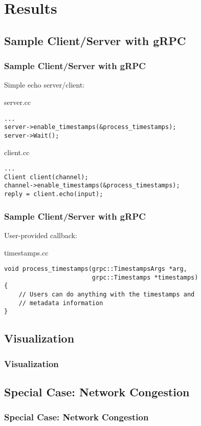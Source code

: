 \documentclass[10pt]{beamer}
\begin{document}

\section{Results}


\subsection{Sample Client/Server with gRPC}
\begin{frame}[fragile]
\frametitle{Sample Client/Server with gRPC}
Simple echo server/client:
\begin{block}{\normalsize server.cc}
      {\small
      \begin{verbatim}
...
server->enable_timestamps(&process_timestamps);
server->Wait();\end{verbatim}
      }
\end{block}
\begin{block}{\normalsize client.cc}
      {\small
      \begin{verbatim}
...
Client client(channel);
channel->enable_timestamps(&process_timestamps);
reply = client.echo(input);\end{verbatim}
      }
\end{block}
\end{frame}

\begin{frame}[fragile]
\frametitle{Sample Client/Server with gRPC}
User-provided callback:
\begin{block}{\normalsize timestamps.cc}
      {\small
      \begin{verbatim}
void process_timestamps(grpc::TimestampsArgs *arg,
                        grpc::Timestamps *timestamps)
{
    // Users can do anything with the timestamps and
    // metadata information
}\end{verbatim}
      }
\end{block}
\end{frame}

\subsection{Visualization}
\begin{frame}
\frametitle{Visualization}
\end{frame}

\subsection{Special Case: Network Congestion}
\begin{frame}
\frametitle{Special Case: Network Congestion}
\end{frame}
\end{document}
